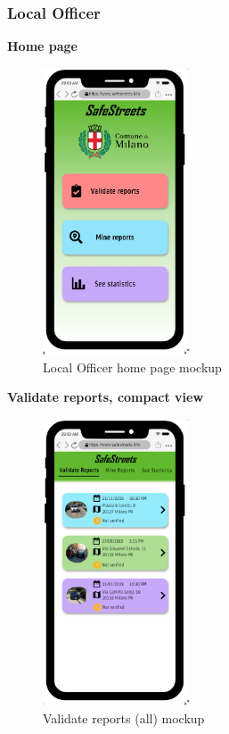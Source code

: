 				\subsubsection{Local Officer}
				\vspace{-2mm}
				\begin{center}
					{\small \textbf{Home page}}
				\end{center}
				\vspace{-5mm}
				\begin{figure}[!h]
					\centering
					\includegraphics[height=8.5cm]{images/MockUp/Authority/LocalOfficer/HomePage.png}
					\caption{Local Officer home page mockup}
				\end{figure}
				\begin{center}
						{\small \textbf{Validate reports, compact view}}
					\end{center}
					\vspace{-5mm}
					\begin{figure}[!h]
						\centering
						\includegraphics[height=8.5cm]{images/MockUp/Authority/LocalOfficer/ValidateReport.png}
						\caption{Validate reports (all) mockup}
					\end{figure}

